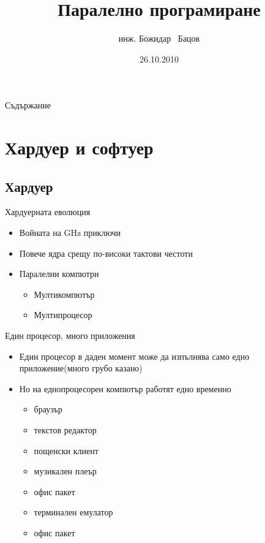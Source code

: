 \documentclass{beamer}
\title{Паралелно програмиране}
\author{инж. Божидар ~Бацов}
\institute{Drow Ltd.}
\date{26.10.2010}
\begin{document}
\begin{frame}
  \titlepage
\end{frame}

\begin{frame}{Съдържание}
  \tableofcontents
\end{frame}




\section{Хардуер и софтуер}

\subsection{Хардуер}

\begin{frame}{Хардуерната еволюция}
  \begin{itemize}
  \item Войната на GHz приключи
  \item Повече ядра срещу по-високи тактови честоти
  \item Паралелни компютри
    \begin{itemize}
      \item Мултикомпютър
      \item Мултипроцесор
    \end{itemize}
  \end{itemize}
\end{frame}

\begin{frame}{Един процесор, много приложения}
  \transdissolve
  \begin{itemize}
  \item Един процесор в даден момент може да изпълнява само едно
    приложение(много грубо казано)
  \item Но на еднопроцесорен компютър работят едно временно
    \begin{itemize}
      \item браузър
      \item текстов редактор
      \item пощенски клиент
      \item музикален плеър 
      \item офис пакет
      \item терминален емулатор
      \item офис пакет
    \end{itemize}

  \end{itemize}
\end{frame}
\end{document}
